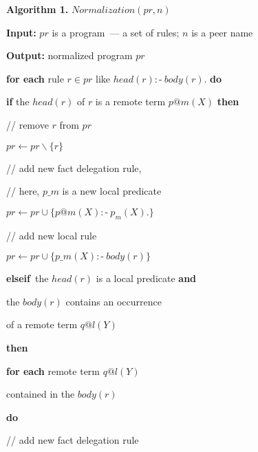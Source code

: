 \begin{multicols}{2}
  \smallskip

\noindent
  \textbf{Algorithm 1.} $Normalization(pr, n)$

\noindent
\textbf{Input:} $pr$ is a program~--- a set of rules; $n$ is a peer name

\noindent
\textbf{Output:} normalized program $pr$

\noindent
\textbf{for each} rule $r \in pr$ {like} $head(r):\!\mbox{-}\ body(r)$.
\textbf{do}

  \hspace*{1mm}\textbf{if} the $head(r)$ of $r$ is a remote term $p@m(X)$
\textbf{then}

  \hspace*{3mm}// remove $r$ from $pr$

  \hspace*{3mm}$pr \leftarrow pr \backslash\{r\}$

  \hspace*{3mm}// add new fact delegation rule,

  \hspace{3mm}// here, $p\_m$ is a new local predicate

  \hspace*{3mm}$pr \leftarrow pr \cup \{ p@m(X):\!\mbox{-}\ p_m(X).\}$

  \hspace*{3mm}// add new local rule

  \hspace*{3mm}$pr \leftarrow pr \cup \{ p\_m(X) :\!\mbox{-}\ body(r)\}$

  \hspace{1mm}\textbf{elseif}\ the $head(r)$ is a local predicate \textbf{and}

       \hspace*{3mm}the $body(r)$ contains an occurrence
       
       \hspace*{3mm}of a remote  term $q@l(Y)$

  \hspace*{1mm}\textbf{then}

  \hspace*{2mm}\textbf{for each} remote term $q@l(Y)$ 

  \hspace*{14mm}contained in the $body(r)$ 
  
  \hspace*{2mm}\textbf{do}

  \hspace*{6mm}// add new fact delegation rule


\end{multicols}
